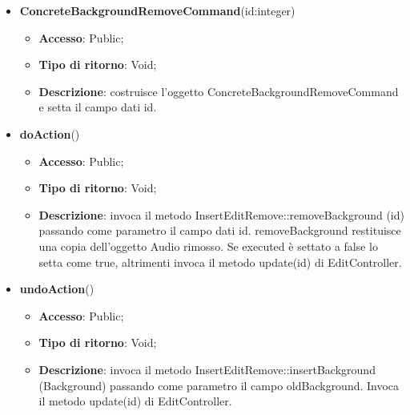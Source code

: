{{{	
	\begin{itemize}
		\item \textbf{ConcreteBackgroundRemoveCommand}(id:integer)
		\begin{itemize}
			\item \textbf{Accesso}: Public;
			\item \textbf{Tipo di ritorno}: Void;
			\item \textbf{Descrizione}: costruisce l’oggetto ConcreteBackgroundRemoveCommand e setta il campo dati id.
		\end{itemize}
		\item \textbf{doAction}()
		\begin{itemize}
			\item \textbf{Accesso}: Public;
			\item \textbf{Tipo di ritorno}: Void;
			\item \textbf{Descrizione}: invoca il metodo InsertEditRemove::removeBackground (id) passando come parametro il campo dati id. removeBackground restituisce una copia dell’oggetto Audio rimosso. Se executed è settato a false lo setta come true, altrimenti invoca il metodo update(id) di EditController.
		\end{itemize}
		\item \textbf{undoAction}()
		\begin{itemize}
			\item \textbf{Accesso}: Public;
			\item \textbf{Tipo di ritorno}: Void;
			\item \textbf{Descrizione}: invoca il metodo InsertEditRemove::insertBackground (Background) passando come parametro il campo oldBackground. Invoca il metodo update(id) di EditController.
		\end{itemize}
	\end{itemize}
	}
	
}}
